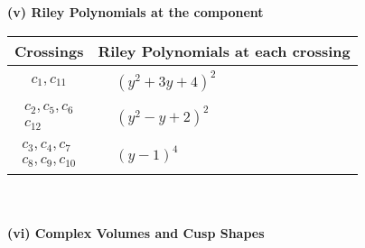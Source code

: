 \documentclass[1p]{elsarticle_modified}
\theoremstyle{definition}
\begin{document}
\newpage\renewcommand{\arraystretch}{1}
\flushleft \textbf{(v) Riley Polynomials at the component}\newline \\
\begin{tabular}{m{50pt}|m{274pt}}
Crossings & \hspace{64pt}Riley Polynomials at each crossing \\
\hline $$\begin{aligned}c_{1},c_{11}\end{aligned}$$&$\begin{aligned}
&(y^2+3 y+4)^2
\end{aligned}$\\
\hline $$\begin{aligned}c_{2},c_{5},c_{6}\\c_{12}\end{aligned}$$&$\begin{aligned}
&(y^2- y+2)^2
\end{aligned}$\\
\hline $$\begin{aligned}c_{3},c_{4},c_{7}\\c_{8},c_{9},c_{10}\end{aligned}$$&$\begin{aligned}
&(y-1)^4
\end{aligned}$\\
\hline
\end{tabular}\\~\\
\newpage\flushleft \textbf{(vi) Complex Volumes and Cusp Shapes}
\end{document}
